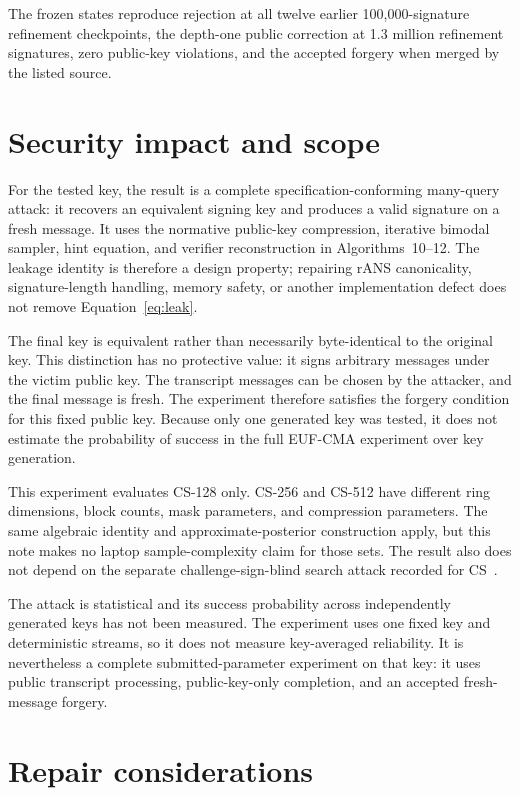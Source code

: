 \documentclass[11pt]{article}
\begin{document}
The frozen states reproduce rejection at all twelve earlier 100,000-signature refinement
checkpoints, the depth-one public correction at 1.3 million refinement signatures, zero
public-key violations, and the accepted forgery when merged by the listed source.

\section{Security impact and scope}
\label{sec:scope}

For the tested key, the result is a complete specification-conforming many-query attack: it
recovers an equivalent signing key and produces a valid signature on a fresh message.  It uses
the normative public-key compression, iterative bimodal sampler, hint equation, and verifier
reconstruction in Algorithms~10--12.  The leakage identity is therefore a design property;
repairing rANS canonicality, signature-length handling, memory safety, or another
implementation defect does not remove Equation~\eqref{eq:leak}.

The final key is equivalent rather than necessarily byte-identical to the original key.  This
distinction has no protective value: it signs arbitrary messages under the victim public key.
The transcript messages can be chosen by the attacker, and the final message is fresh.  The
experiment therefore satisfies the forgery condition for this fixed public key.  Because only
one generated key was tested, it does not estimate the probability of success in the full
EUF-CMA experiment over key generation.

This experiment evaluates CS-128 only.  CS-256 and CS-512 have different ring dimensions,
block counts, mask parameters, and compression parameters.  The same algebraic identity and
approximate-posterior construction apply, but this note makes no laptop sample-complexity claim for those
sets.  The result also does not depend on the separate challenge-sign-blind search attack
recorded for CS~\cite{ngcc-report}.

The attack is statistical and its success probability across independently generated keys has
not been measured.  The experiment uses one fixed key and deterministic streams, so it does
not measure key-averaged reliability.  It is nevertheless a complete submitted-parameter
experiment on that key: it uses public transcript processing, public-key-only completion, and
an accepted fresh-message forgery.

\section{Repair considerations}
\label{sec:repair}
\end{document}
